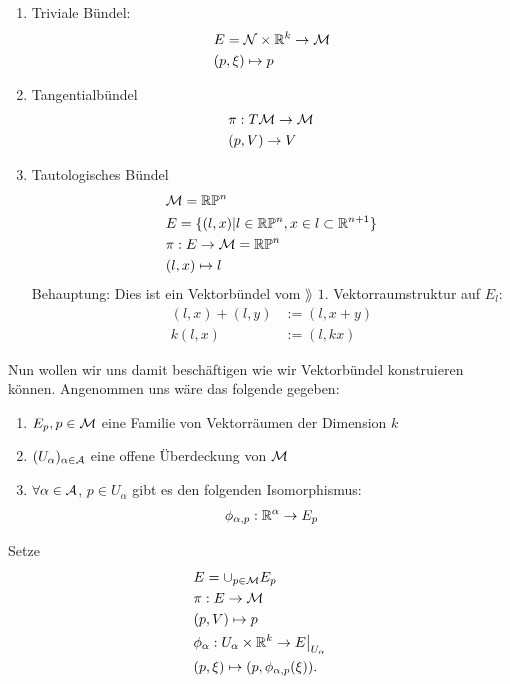 \begin{bsp} \leavevmode
\begin{enumerate}
\item Triviale Bündel:
\begin{align}
&E = \mathcal{N} \times \mathbb{R}^k \to \mathcal{M}\\
&(p, \xi) \mapsto p
\end{align}
\item Tangentialbündel 
\begin{align}
&\pi: T\mathcal{M} \to \mathcal{M}\\
&(p, V) \to V
\end{align}
\item Tautologisches Bündel
\begin{align}
&\mathcal{M} = \mathbb{R} \mathbb{P}^n\\
&E = \{ (l, x) \vert l \in \mathbb{R} \mathbb{P}^n, x\in l \subset \mathbb{R}^{n+1} \}\\
&\pi: E \to \mathcal{M} = \mathbb{R} \mathbb{P}^n\\
&(l, x) \mapsto l
\end{align}
Behauptung: Dies ist ein Vektorbündel vom $\rang$ $1$.
Vektorraumstruktur auf $E_l$:
\begin{align}
(l, x) + (l, y) &:= (l, x + y)\\
k (l, x) &:= (l, k x)
\end{align}
\end{enumerate}
\end{bsp}
Nun wollen wir uns damit beschäftigen wie wir Vektorbündel konstruieren können.
Angenommen uns wäre das folgende gegeben:
\begin{enumerate}
\item $E_p, p\in \mathcal{M}$ eine Familie von Vektorräumen der Dimension $k$
\item $(U_\alpha)_{\alpha \in \mathcal{A}}$ eine offene Überdeckung von $\mathcal{M}$
\item $\forall \alpha \in \mathcal{A}$, $p\in U_\alpha$ gibt es den folgenden Isomorphismus:
\begin{align}
\phi_{\alpha, p}: \mathbb{R}^\alpha \to E_p
\end{align}
\end{enumerate}
Setze 
\begin{align}
&E = \cup_{p \in \mathcal{M}} E_p\\
&\pi : E \to \mathcal{M}\\
&(p, V) \mapsto p\\
&\phi_\alpha: U_\alpha \times \mathbb{R}^k \to E \big\vert_{U_\alpha}\\
&(p, \xi) \mapsto (p, \phi_{\alpha, p}(\xi)).
\end{align}
